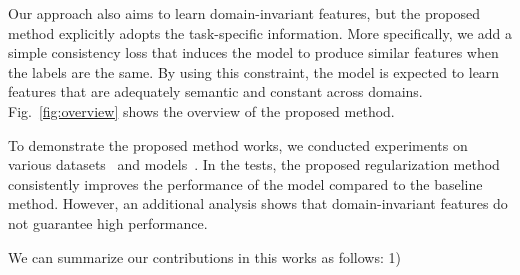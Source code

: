 Our approach also aims to learn domain-invariant features, but the proposed method explicitly adopts the task-specific information. More specifically, we add a simple consistency loss that induces the model to produce similar features when the labels are the same. By using this constraint, the model is expected to learn features that are adequately semantic and constant across domains. Fig.~\ref{fig:overview} shows the overview of the proposed method.

To demonstrate the proposed method works, we conducted experiments on various datasets~\cite{chen2013vlcs, Li2017dg} and models~\cite{He2016resnet}. In the tests, the proposed regularization method consistently improves the performance of the model compared to the baseline method. However, an additional analysis shows that domain-invariant features do not guarantee high performance.

We can summarize our contributions in this works as follows: 1)

